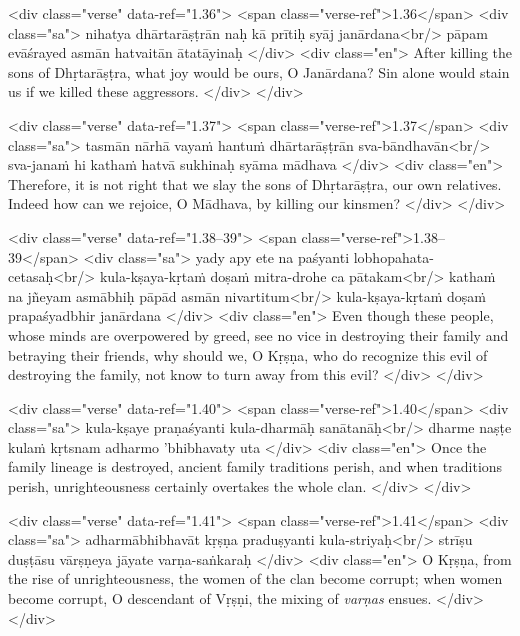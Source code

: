 \begin{html}
<div class="verse" data-ref="1.36">
  <span class="verse-ref">1.36</span>
  <div class="sa">
    nihatya dhārtarāṣṭrān naḥ kā prītiḥ syāj janārdana<br/>
    pāpam evāśrayed asmān hatvaitān ātatāyinaḥ
  </div>
  <div class="en">
    After killing the sons of Dhṛtarāṣṭra, what joy would be ours, O Janārdana? Sin alone would stain us if we killed these aggressors.
  </div>
</div>
\end{html}



\begin{html}
<div class="verse" data-ref="1.37">
  <span class="verse-ref">1.37</span>
  <div class="sa">
    tasmān nārhā vayaṁ hantuṁ dhārtarāṣṭrān sva-bāndhavān<br/>
    sva-janaṁ hi kathaṁ hatvā sukhinaḥ syāma mādhava
  </div>
  <div class="en">
    Therefore, it is not right that we slay the sons of Dhṛtarāṣṭra, our own relatives. Indeed how can we rejoice, O Mādhava, by killing our kinsmen?
  </div>
</div>
\end{html}



\begin{html}
<div class="verse" data-ref="1.38–39">
  <span class="verse-ref">1.38–39</span>
  <div class="sa">
    yady apy ete na paśyanti lobhopahata-cetasaḥ<br/>
    kula-kṣaya-kṛtaṁ doṣaṁ mitra-drohe ca pātakam<br/>
    kathaṁ na jñeyam asmābhiḥ pāpād asmān nivartitum<br/>
    kula-kṣaya-kṛtaṁ doṣaṁ prapaśyadbhir janārdana
  </div>
  <div class="en">
    Even though these people, whose minds are overpowered by greed, see no vice in destroying their family and betraying their friends, why should we, O Kṛṣṇa, who do recognize this evil of destroying the family, not know to turn away from this evil?
  </div>
</div>
\end{html}



\begin{html}
<div class="verse" data-ref="1.40">
  <span class="verse-ref">1.40</span>
  <div class="sa">
    kula-kṣaye praṇaśyanti kula-dharmāḥ sanātanāḥ<br/>
    dharme naṣṭe kulaṁ kṛtsnam adharmo ’bhibhavaty uta
  </div>
  <div class="en">
    Once the family lineage is destroyed, ancient family traditions perish, and when traditions perish, unrighteousness certainly overtakes the whole clan.
  </div>
</div>
\end{html}



\begin{html}
<div class="verse" data-ref="1.41">
  <span class="verse-ref">1.41</span>
  <div class="sa">
    adharmābhibhavāt kṛṣṇa praduṣyanti kula-striyaḥ<br/>
    strīṣu duṣṭāsu vārṣṇeya jāyate varṇa-saṅkaraḥ
  </div>
  <div class="en">
    O Kṛṣṇa, from the rise of unrighteousness, the women of the clan become corrupt; when women become corrupt, O descendant of Vṛṣṇi, the mixing of \textit{varṇas} ensues.
  </div>
</div>
\end{html}



